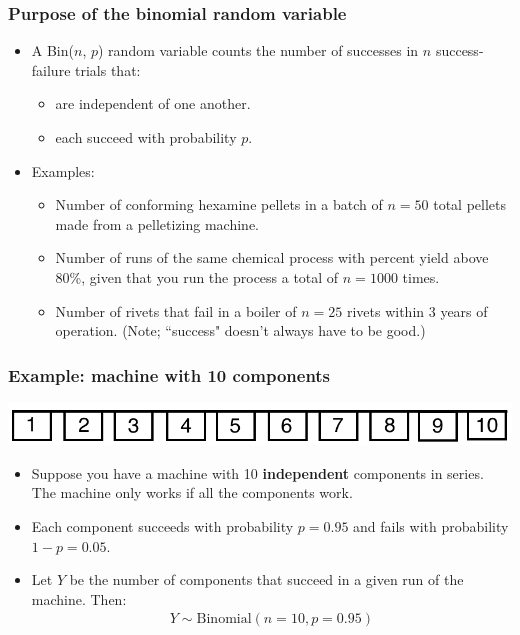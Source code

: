 \documentclass[handout]{beamer}\usepackage{graphicx, color}
\numberwithin{equation}{section}
\begin{document}
\begin{frame}
\frametitle{Purpose of the binomial random variable}
\begin{itemize}
\item  A Bin($n$, $p$) random variable counts the number of successes in $n$ success-failure trials that:
\begin{itemize}
\pause \item are independent of one another.
\pause \item each succeed with probability $p$.
\end{itemize}
\pause \item Examples:
\begin{itemize}
\pause \item Number of conforming hexamine pellets in a batch of $n = 50$ total pellets made from a pelletizing machine.
\pause \item Number of runs of the same chemical process with percent yield above 80\%, given that you run the process a total of $n = 1000$ times.
\pause \item Number of rivets that fail in a boiler of $n = 25$ rivets within 3 years of operation. (Note; ``success" doesn't always have to be good.)
\end{itemize}
\end{itemize}
\end{frame}

\begin{frame}
\frametitle{Example: machine with 10 components}
\begin{center}
 \includegraphics{../../fig/mach1.png}
\end{center}
\begin{itemize}
\pause \item Suppose you have a machine with 10 {\bf independent} components in series. The machine only works if all the components work.
\pause \item Each component succeeds with probability $p = 0.95$ and fails with probability $1 - p = 0.05$.  \
\pause \item Let $Y$ be the number of components that succeed in a given run of the machine. Then:
\begin{align*}
Y \sim \text{Binomial}(n = 10, p = 0.95)
\end{align*}
\end{itemize}

\end{frame}
\end{document}
